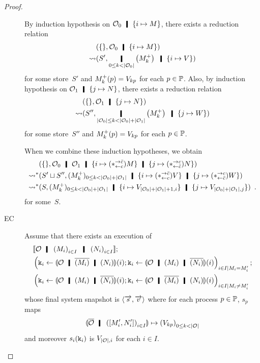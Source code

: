 \begin{proof}
\begin{description}
	  By induction hypothesis on $\hypert_0\hmid \imapsto{M}$,
	  there exists a reduction relation
	  \begin{align*}
	   &\concreteconf{\{\}}{ \hypert_0\hmid \imapsto{M} } \\
	   \reduce&
	   \concreteconf{S'}{\operatorname*{\hmid}_{0\le k<|\hypert_0|}
	   \left(\m{M}_k\right)
	   \hmid \{i\mapsto {V}\}}
	  \end{align*}
	  for some store~$S'$ and ${M}^+_k(p) = V_{kp}$ for each $p\in
	  \mathbb{P}$.
	  Also,
	  by induction hypothesis on $\hypert_1\hmid \jmapsto{N}$,
	  there exists a reduction relation
	  \begin{align*}
	   &\concreteconf{\{\}}{ \hypert_1\hmid \jmapsto{N} } \\
	   \reduce&
	   \concreteconf{S''}{\operatorname*{\hmid}_{|\hypert_0|\le
	   k<|\hypert_0| + |\hypert_1|}
	   \left(\m{M}_k\right)
	   \hmid \{j\mapsto {W}\}}
	  \end{align*}
	  for some store~$S''$ and ${M}^+_k(p) = V_{kp}$ for each $p\in
	  \mathbb{P}$.

	  When we combine these induction hypotheses,
	  we obtain
	  \begin{align*}
	   &\concreteconf{\{\}}{
	   \hypert_0\hmid \hypert_1\hmid \{i\mapsto (\comodL) M\}\hmid
	   \{j\mapsto (\comodR)N\}
	   }\\
	   \reduction & \concreteconf{S'\sqcup S''}{ (\m{M}_k)_{0\le k <
	   |\hypert_0|+ |\hypert_1|} \hmid
	   \{i\mapsto(\comodL)V\} \hmid \{j\mapsto (\comodR)W\}}\\
	   \reduction&
	   \concreteconf{S}{(\m{M}_k)_{0\le k <
	   |\hypert_0|+ |\hypert_1|}\hmid
	   \imapsto{V_{|\hypert_0|+|\hypert_1|+1,i}}
	   \hmid\jmapsto{V_{|\hypert_0|+|\hypert_1|,j}}
	   }\enspace.
	  \end{align*}
	  for some~$S$.
     \item[EC]
	  Assume that there exists an execution of
	  \begin{align*}
	   &\semo{\hypert\hmid \left(M_i\right)_{i\in I} \hmid
	   \left(N_i\right)_{i\in I}}; \\
	   &\left(\p k_i\leftarrow
	   \semoi{\hypert\hmid \overline{(M_i)}\hmid
	   (N_i)}(i)
	   ; \p k_i \leftarrow \semoi{\hypert\hmid {(M_i)}\hmid
	   \overline{(N_i)}}(i)\right)_{i\in I\mid M_i =
	   M'_i};
	   \\ &
	   \left(\p k_i\leftarrow
	   \semoi{\hypert\hmid {(M_i)}\hmid
	   \overline{(N_i)}}(i)
	   ; \p k_i \leftarrow
	   \semoi{\hypert\hmid \overline{(M_i)}\hmid
	   (N_i)}(i)
	   \right)_{i\in I\mid M_i \neq
	   M'_i}
	  \end{align*}
	  whose final system snapshot is $\langle{\overrightarrow s, \overrightarrow v}\rangle$
	  where for each process $p\in \mathbb{P}$, $s_p$ maps
	  \[
	   \semoi{\overline{\hypert}\hmid
	  \left(\cotuple{M'_i,N'_i}\right)_{i\in I}}
	  \mapsto
	  \left(V_{kp}\right)_{0\le k < |\hypert|}
	  \]
	  and moreover $s_i(\texttt{k}_i)$ is $V_{|\mathcal{O}|,i}$ for each $i\in
	  I$.


\end{description}
\end{proof}
